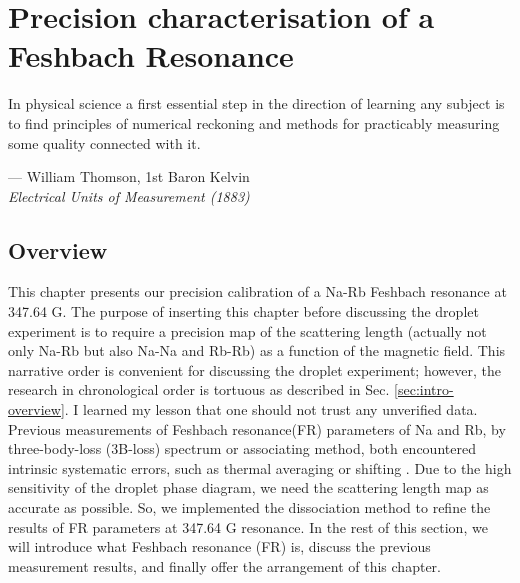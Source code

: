 \chapter{Precision characterisation of a Feshbach Resonance}
\label{Chap_Feshbach}

\setlength{\unitlength}{1pt}
\setlength{\epigraphwidth}{11.5cm}
\epigraph{In physical science a first essential step in the direction of learning any subject is to find principles of numerical reckoning and methods for practicably measuring some quality connected with it. \cite{thomson_2011}}{--- William Thomson, 1st Baron Kelvin \\ \textit{Electrical Units of Measurement (1883)}}

\section{Overview}
This chapter presents our precision calibration of a Na-Rb Feshbach resonance at 347.64 G. The purpose of inserting this chapter before discussing the droplet experiment is to require a precision map of the scattering length (actually not only Na-Rb but also Na-Na and Rb-Rb) as a function of the magnetic field. This narrative order is convenient for discussing the droplet experiment; however, the research in chronological order is tortuous as described in Sec. \ref{sec:intro-overview}. I learned my lesson that one should not trust any unverified data. Previous measurements of Feshbach resonance(FR) parameters of Na and Rb, by three-body-loss (3B-loss) spectrum or associating method, both encountered intrinsic systematic errors, such as thermal averaging or shifting \cite{Bartenstein2005, Zurn2013}. Due to the 
high sensitivity of the droplet phase diagram, we need the scattering length map as accurate as possible. So, we implemented the dissociation method to refine the results of FR parameters at 347.64 G resonance. In the rest of this section, we will introduce what Feshbach resonance (FR) is, discuss the previous measurement results, and finally offer the arrangement of this chapter.

